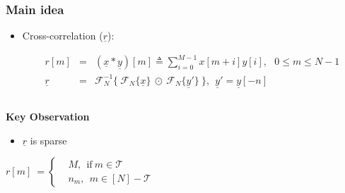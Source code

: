 \documentclass[10pt,xcolor=table]{beamer}
\newcommand{\defeq}{\triangleq}
\newcommand{\xv}{\underline{x}}
\newcommand{\yv}{\underline{y}}
\newcommand{\rv}{\underline{r}}
\begin{document}
\begin{frame}\frametitle{Main idea}
	\vspace{-0.4cm}
			\begin{block}{}
			
				\begin{itemize}
					\item {Cross-correlation} ($\rv$):
					
                    \begin{eqnarray}
                    \nonumber
					r[m] & = & (\xv*\yv)[m] \defeq \sum_{i=0}^{M-1} x[m+i] y[i], ~ ~ \ 0 \leq m \leq N-1\\
                    \nonumber
					\rv  & = & \mathcal{F}_{N}^{-1} \{~  \mathcal{F}_{N}\{\xv\} ~ \odot ~  \mathcal{F}_{N}\{\yv'\} ~ \}, \ \ \yv' = \yv[-n]
					\end{eqnarray}					
				\end{itemize}
			\end{block}
			
				\begin{columns}
			\begin{block}{\alert{ \bf Key Observation}}
			\vspace{0.2cm}
				\begin{itemize}
					\item $\rv$ is {\color{blue}sparse}
				\end{itemize}
				 \begin{equation} \label{eqn:RXY_sparse}\nonumber
				 r[m] \ = \left\{
				 \begin{array}{ll}
				 &M,~~  \text{if} \ m \in \mathcal{T} \\
				 & n_m,~~ m \in [N]-\mathcal{T}
				 \end{array}
				 \right.  			
				 \end{equation}
			\end{block}
						
					\begin{figure}
						\centering
						\scalebox{0.35}{}
					\end{figure}
					
				\end{columns}
				
					
\end{frame}
\def\fracty{0.45}
\def\fractx{0.8}
\end{document}
